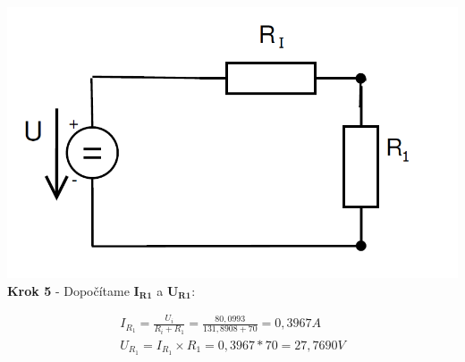 \begin{center}
\includegraphics[scale=0.5,keepaspectratio]{fig/obr/Pr2_4.png} \\
\textbf{Krok 5} - Dopočítame  $\boldsymbol{I_{R1}}$ a  $\boldsymbol{U_{R1}}$:
\end{center}

\begin{gather*}
I_{R_{1}}=\frac{U_{i}}{R_{i}+R_{1}}=\frac{80,0993}{131,8908+70}=0,3967A \\
U_{R_{1}}=I_{R_{1}} \times R_{1}=0,3967*70=27,7690V\\
\end{gather*}
